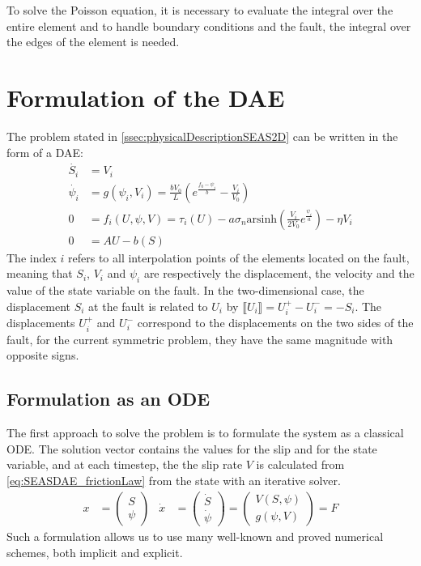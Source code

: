 \documentclass{report}
\begin{document}
To solve the Poisson equation, it is necessary to evaluate the integral over the entire element and to handle boundary conditions and the fault, the integral over the edges of the element is needed. 


\section{Formulation of the DAE}
The problem stated in \autoref{ssec:physicalDescriptionSEAS2D} can be written in the form of a DAE:
\begin{align}
    \dot{S_i} &= V_i \label{eq:SEASDAE_dV_dt} \\
	\dot{\psi_i} &= g(\psi_i, V_i) =\frac{bV_0}{L}\left(e^{\frac{f_0-\psi_i}{b}} - \frac{V_i}{V_0}\right) \label{eq:SEAS_DAE_ageing_law} \\
	0 &= f_i(U,\psi,V) = \tau_i(U) - a\sigma_n\text{arsinh}\left(\frac{V_i}{2V_0}e^{\frac{\psi_i}{a}}\right) -\eta V_i \label{eq:SEASDAE_frictionLaw}\\
    0 &= AU - b(S) \label{eq:SEAS_DAE_AU=b}  
\end{align}
The index $i$ refers to all interpolation points of the elements located on the fault, meaning that $S_i$, $V_i$ and $\psi_i$ are respectively the displacement, the velocity and the value of the state variable on the fault. In the two-dimensional case, the displacement $S_i$ at the fault is related to $U_i$ by $\llbracket U_i \rrbracket = U_i^+ - U_i^- = -S_i$. The displacements $U_i^+$ and $U_i^-$ correspond to the displacements on the two sides of the fault, for the current symmetric problem, they have the same magnitude with opposite signs.\\
 

\subsection{Formulation as an ODE}
The first approach to solve the problem is to formulate the system as a classical ODE. The solution vector contains the values for the slip and for the state variable, and at each timestep, the the slip rate $V$ is calculated from \autoref{eq:SEASDAE_frictionLaw} from the state with an iterative solver.
\begin{align}
	\label{eq:ODE_formulation_SEAS}
	x &= \begin{pmatrix}
		S \\ \psi
	\end{pmatrix} & \dot{x} &= \begin{pmatrix}
								  \dot{S} \\ \dot{\psi}
							   \end{pmatrix} = \begin{pmatrix}
												   V(S,\psi) \\ g(\psi, V)
											   \end{pmatrix} = F
\end{align} 
Such a formulation allows us to use many well-known and proved numerical schemes, both implicit and explicit. 
\end{document}
